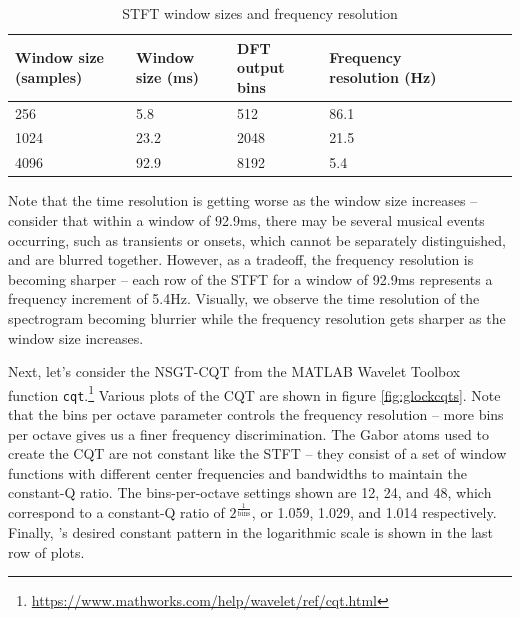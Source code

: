 \documentclass[letter,12pt]{article}
\begin{document}
\begin{table}[ht]
	\centering
\begin{tabular}{ |l|l|l|l|c|c|c|c| }
	 \hline
	  Window size (samples) & Window size (ms) & DFT output bins & Frequency resolution (Hz) \\
	 \hline
	 \hline
	 256 & 5.8 & 512 & 86.1 \\
	 \hline
	 1024 & 23.2 & 2048 & 21.5  \\
	 \hline
	 4096 & 92.9 & 8192 & 5.4  \\
	 \hline
\end{tabular}
	\caption{STFT window sizes and frequency resolution}
	\label{table:stftparams}
\end{table}

Note that the time resolution is getting worse as the window size increases -- consider that within a window of 92.9ms, there may be several musical events occurring, such as transients or onsets, which cannot be separately distinguished, and are blurred together. However, as a tradeoff, the frequency resolution is becoming sharper -- each row of the STFT for a window of 92.9ms represents a frequency increment of 5.4Hz. Visually, we observe the time resolution of the spectrogram becoming blurrier while the frequency resolution gets sharper as the window size increases.

Next, let's consider the NSGT-CQT from the MATLAB Wavelet Toolbox function \Verb#cqt#.\footnote{\url{https://www.mathworks.com/help/wavelet/ref/cqt.html}} Various plots of the CQT are shown in figure \ref{fig:glockcqts}. Note that the bins per octave parameter controls the frequency resolution -- more bins per octave gives us a finer frequency discrimination. The Gabor atoms used to create the CQT are not constant like the STFT -- they consist of a set of window functions with different center frequencies and bandwidths to maintain the constant-Q ratio. The bins-per-octave settings shown are 12, 24, and 48, which correspond to a constant-Q ratio of $2^{\frac{1}{\text{bins}}}$, or 1.059, 1.029, and 1.014 respectively. Finally, \citet{jbrown}'s desired constant pattern in the logarithmic scale is shown in the last row of plots.
\end{document}
